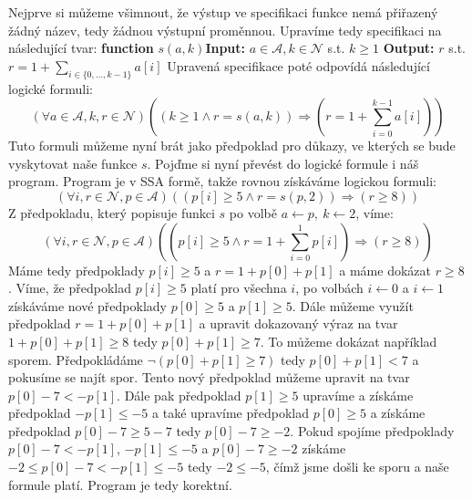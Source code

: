 \documentclass{article}
\begin{document}
Nejprve si můžeme všimnout, že výstup ve specifikaci funkce nemá přiřazený žádný název, tedy žádnou výstupní proměnnou. Upravíme tedy specifikaci na následující tvar: \newline\newline \textbf{function} $s(a,k)$\newline \textbf{Input:} $a \in \mathcal{A}, k \in \mathcal{N}$ s.t. $k \geq 1$ \newline \textbf{Output:} $r$ s.t. $r = 1 + \sum_{i \in \{0,...,k-1\}}^{} a[i]$ \newline\newline Upravená specifikace poté odpovídá následující logické formuli: 
$$(\forall a \in \mathcal{A}, k, r \in \mathcal{N})((k \geq 1 \wedge r = s(a,k)) \Rightarrow  (r = 1 + \sum_{i = 0}^{k-1} a[i]))$$ Tuto formuli můžeme nyní brát jako předpoklad pro důkazy, ve kterých se bude vyskytovat naše funkce $s$. Pojďme si nyní převést do logické formule i náš program. Program je v SSA formě, takže rovnou získáváme logickou formuli:
$$(\forall i,r \in \mathcal{N}, p \in \mathcal{A})((p[i] \geq 5 \wedge r = s(p,2)) \Rightarrow (r \geq 8))$$
Z předpokladu, který popisuje funkci $s$ po volbě $a \leftarrow p,\ k \leftarrow 2$, víme:
$$(\forall i,r \in \mathcal{N}, p \in \mathcal{A})((p[i] \geq 5 \wedge r = 1 + \sum_{i = 0}^{1} p[i]) \Rightarrow (r \geq 8))$$
Máme tedy předpoklady $p[i] \geq 5$ a  $r = 1 + p[0] + p[1]$ a máme dokázat $r \geq 8$. Víme, že předpoklad $p[i] \geq 5$ platí pro všechna $i$, po volbách $i \leftarrow 0$ a $i \leftarrow 1$ získáváme nové předpoklady $p[0] \geq 5$ a $p[1] \geq 5$. Dále můžeme využít předpoklad $r = 1 + p[0] + p[1]$ a upravit dokazovaný výraz na tvar $1 + p[0] + p[1] \geq 8$ tedy $p[0] + p[1] \geq 7$. To můžeme dokázat například sporem. Předpokládáme  $\neg (p[0] + p[1] \geq 7)$ tedy $p[0] + p[1] < 7$ a pokusíme se najít spor. Tento nový předpoklad můžeme upravit na tvar $p[0] - 7 < -p[1]$. Dále pak předpoklad $p[1] \geq 5$ upravíme a získáme předpoklad $-p[1] \leq -5$ a také upravíme předpoklad $p[0] \geq 5$ a získáme předpoklad $p[0] - 7 \geq 5 - 7$ tedy $p[0] - 7 \geq -2$. Pokud spojíme předpoklady $p[0] - 7 < -p[1]$, $-p[1] \leq -5$ a $p[0] - 7 \geq -2$ získáme $-2 \leq p[0] - 7 < -p[1] \leq -5$ tedy $-2 \leq -5$, čímž jsme došli ke sporu a naše formule platí. Program je tedy korektní.
\end{document}
